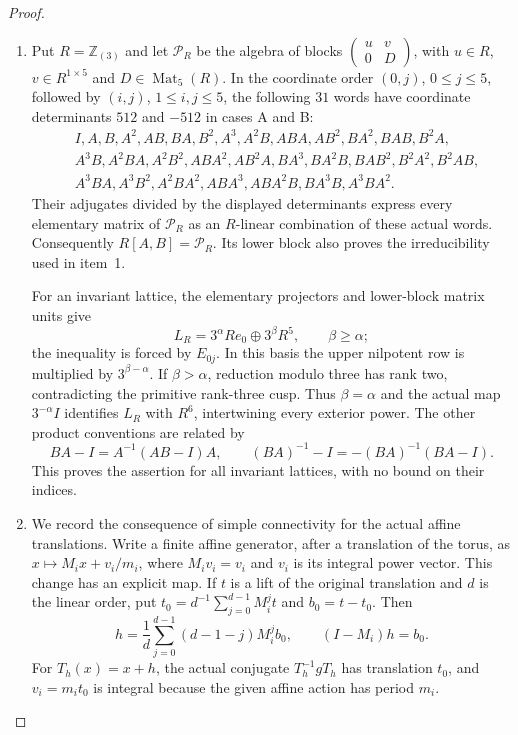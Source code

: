 \begin{proof}
\begin{enumerate}[label=\arabic*.]
\item Put $R=\mathbb Z_{(3)}$ and let $\mathcal P_R$ be the algebra
of blocks $\left(\begin{smallmatrix}u&v\\0&D\end{smallmatrix}\right)$,
with $u\in R$, $v\in R^{1\times5}$ and $D\in\operatorname{Mat}_5(R)$.
In the coordinate order $(0,j)$, $0\leq j\leq5$, followed by
$(i,j)$, $1\leq i,j\leq5$, the following $31$ words have coordinate
determinants $512$ and $-512$ in cases A and B:
\[
\begin{aligned}
&I,A,B,A^2,AB,BA,B^2,A^3,A^2B,ABA,AB^2,BA^2,BAB,B^2A,\\
&A^3B,A^2BA,A^2B^2,ABA^2,AB^2A,BA^3,BA^2B,BAB^2,B^2A^2,B^2AB,\\
&A^3BA,A^3B^2,A^2BA^2,ABA^3,ABA^2B,BA^3B,A^3BA^2.
\end{aligned}
\]
Their adjugates divided by the displayed determinants express
every elementary matrix of $\mathcal P_R$ as an $R$-linear
combination of these actual words.  Consequently $R[A,B]=\mathcal P_R$.
Its lower block also proves the irreducibility used in item~1.

For an invariant lattice, the elementary projectors and lower-block
matrix units give
\[
 L_R=3^\alpha Re_0\oplus3^\beta R^5,\qquad \beta\geq\alpha;
\]
the inequality is forced by $E_{0j}$.  In this basis the upper
nilpotent row is multiplied by $3^{\beta-\alpha}$.  If
$\beta>\alpha$, reduction modulo three has rank two, contradicting
the primitive rank-three cusp.  Thus $\beta=\alpha$ and the actual
map $3^{-\alpha}I$ identifies $L_R$ with $R^6$, intertwining every
exterior power.  The other product conventions are related by
\[
 BA-I=A^{-1}(AB-I)A,\qquad
 (BA)^{-1}-I=-(BA)^{-1}(BA-I).
\]
This proves the assertion for all invariant lattices, with no
bound on their indices.

\item We record the consequence of simple connectivity for the
actual affine translations.  Write a finite affine generator,
after a translation of the torus, as
$x\mapsto M_ix+v_i/m_i$, where $M_iv_i=v_i$ and $v_i$ is its
integral power vector.  This change has an explicit map.  If $t$
is a lift of the original translation and $d$ is the linear order,
put $t_0=d^{-1}\sum_{j=0}^{d-1}M_i^jt$ and $b_0=t-t_0$.
Then
\[
 h=\frac1d\sum_{j=0}^{d-1}(d-1-j)M_i^jb_0,
 \qquad (I-M_i)h=b_0.
\]
For $T_h(x)=x+h$, the actual conjugate $T_h^{-1}gT_h$ has translation $t_0$, and
$v_i=m_it_0$ is integral because the given affine action has
period $m_i$.


\end{enumerate}
\end{proof}
